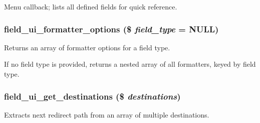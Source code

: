 Menu callback; lists all defined fields for quick reference. \hypertarget{field__ui_8admin_8inc_a88c9dd1dd2d56b80a7ab2b0ef9b2632b}{
\subsubsection[{field\_\-ui\_\-formatter\_\-options}]{\setlength{\rightskip}{0pt plus 5cm}field\_\-ui\_\-formatter\_\-options (\$ {\em field\_\-type} = {\ttfamily NULL})}}
\label{field__ui_8admin_8inc_a88c9dd1dd2d56b80a7ab2b0ef9b2632b}
Returns an array of formatter options for a field type.

If no field type is provided, returns a nested array of all formatters, keyed by field type. \hypertarget{field__ui_8admin_8inc_a8fdd890b48694b7632b438460c5bd5d5}{
\subsubsection[{field\_\-ui\_\-get\_\-destinations}]{\setlength{\rightskip}{0pt plus 5cm}field\_\-ui\_\-get\_\-destinations (\$ {\em destinations})}}
\label{field__ui_8admin_8inc_a8fdd890b48694b7632b438460c5bd5d5}
Extracts next redirect path from an array of multiple destinations.

